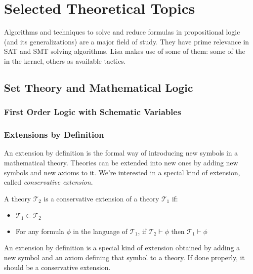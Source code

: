 \chapter{Selected Theoretical Topics}
\label{part:theory}

Algorithms and techniques to solve and reduce formulas in propositional logic (and its generalizations) are a major field of study. They have prime relevance in SAT and SMT solving algorithms. Lisa makes use of some of them: some of the in the kernel, others as available tactics.

\section{Set Theory and Mathematical Logic}
\subsection{First Order Logic with Schematic Variables}
\label{sec:theoryfol}
\subsection{Extensions by Definition}
\label{sec:definitions}

An extension by definition is the formal way of introducing new symbols in a mathematical theory.
Theories can be extended into new ones by adding new symbols and new axioms to it. We're interested in a special kind of extension, called \textit{conservative extension}.
\begin{definition}

  A theory $\mathcal{T}_2$ is a conservative extension of a theory $\mathcal{T}_1$ if:
  \begin{itemize}
    \item $\mathcal{T}_1 \subset \mathcal{T}_2$
    \item For any formula $\phi$ in the language of $\mathcal{T}_1$, if $\mathcal{T}_2 \vdash     \phi$ then $\mathcal{T}_1 \vdash \phi$
  \end{itemize}
\end{definition}

An extension by definition is a special kind of extension obtained by adding a new symbol and an axiom defining that symbol to a theory. If done properly, it should be a conservative extension.

